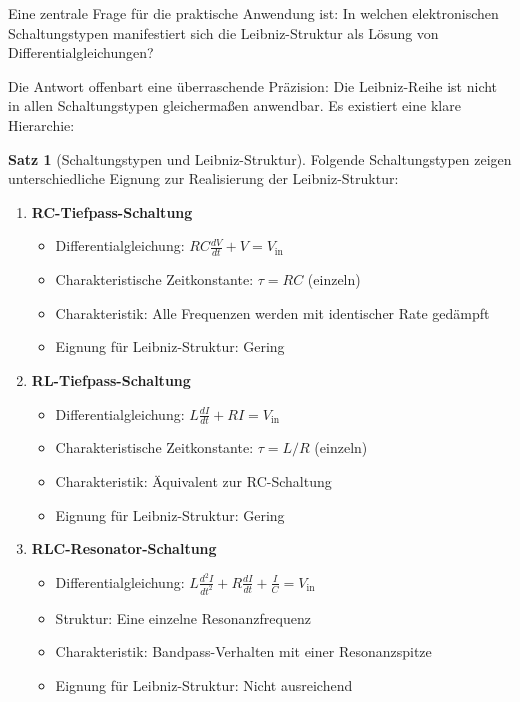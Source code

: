 \documentclass[a4paper,12pt,twoside]{report}
\theoremstyle{definition}
\newtheorem{satz}{Satz}
\begin{document}
Eine zentrale Frage für die praktische Anwendung ist: In welchen elektronischen Schaltungstypen manifestiert sich die Leibniz-Struktur als Lösung von Differentialgleichungen? 

Die Antwort offenbart eine überraschende Präzision: Die Leibniz-Reihe ist nicht in allen Schaltungstypen gleichermaßen anwendbar. Es existiert eine klare Hierarchie:

\begin{satz}[Schaltungstypen und Leibniz-Struktur]
Folgende Schaltungstypen zeigen unterschiedliche Eignung zur Realisierung der Leibniz-Struktur:

\begin{enumerate}
	\item \textbf{RC-Tiefpass-Schaltung}
		\begin{itemize}
			\item Differentialgleichung: $RC \frac{dV}{dt} + V = V_{\text{in}}$
			\item Charakteristische Zeitkonstante: $\tau = RC$ (einzeln)
			\item Charakteristik: Alle Frequenzen werden mit identischer Rate gedämpft
			\item Eignung für Leibniz-Struktur: Gering
		\end{itemize}
	
	\item \textbf{RL-Tiefpass-Schaltung}
		\begin{itemize}
			\item Differentialgleichung: $L \frac{dI}{dt} + RI = V_{\text{in}}$
			\item Charakteristische Zeitkonstante: $\tau = L/R$ (einzeln)
			\item Charakteristik: Äquivalent zur RC-Schaltung
			\item Eignung für Leibniz-Struktur: Gering
		\end{itemize}
	
	\item \textbf{RLC-Resonator-Schaltung}
		\begin{itemize}
			\item Differentialgleichung: $L \frac{d^2 I}{dt^2} + R \frac{dI}{dt} + \frac{I}{C} = V_{\text{in}}$
			\item Struktur: Eine einzelne Resonanzfrequenz
			\item Charakteristik: Bandpass-Verhalten mit einer Resonanzspitze
			\item Eignung für Leibniz-Struktur: Nicht ausreichend
		\end{itemize}
	

\end{enumerate}
\end{satz}
\end{document}
